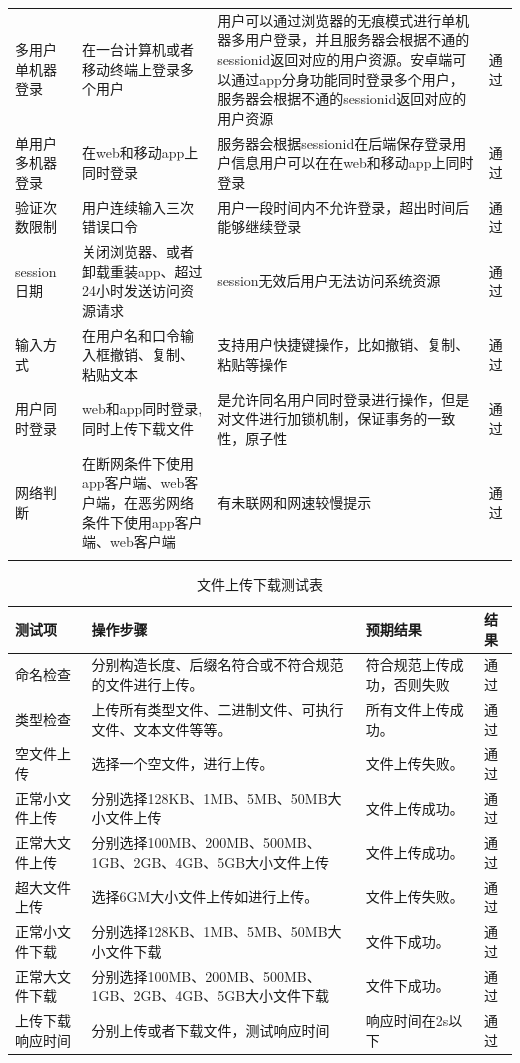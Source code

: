\begin{table}[htbp]
\begin{tabular}{p{2.5cm}p{5cm}p{5cm}p{1cm}}
        多用户单机器登录 & 在一台计算机或者移动终端上登录多个用户 & 用户可以通过浏览器的无痕模式进行单机器多用户登录，并且服务器会根据不通的sessionid返回对应的用户资源。安卓端可以通过app分身功能同时登录多个用户，服务器会根据不通的sessionid返回对应的用户资源 & 通过 \\
        单用户多机器登录 & 在web和移动app上同时登录 & 服务器会根据sessionid在后端保存登录用户信息用户可以在在web和移动app上同时登录 & 通过 \\
        验证次数限制 & 用户连续输入三次错误口令 & 用户一段时间内不允许登录，超出时间后能够继续登录 & 通过 \\
        session日期 & 关闭浏览器、或者卸载重装app、超过24小时发送访问资源请求 & session无效后用户无法访问系统资源 & 通过 \\
        输入方式 & 在用户名和口令输入框撤销、复制、粘贴文本 & 支持用户快捷键操作，比如撤销、复制、粘贴等操作 & 通过 \\
        用户同时登录 & web和app同时登录,同时上传下载文件 & 是允许同名用户同时登录进行操作，但是对文件进行加锁机制，保证事务的一致性，原子性 & 通过 \\
        网络判断 & 在断网条件下使用app客户端、web客户端，在恶劣网络条件下使用app客户端、web客户端 & 有未联网和网速较慢提示 & 通过 \\
        \bottomrule 
    \label{security_user}
    \end{tabular}
\end{table}
\begin{table}[htbp]\center
    \caption{文件上传下载测试表}
    \begin{tabular}{p{4cm}p{5.5cm}p{2.5cm}p{1cm}}
        \toprule
        测试项 &  操作步骤 & 预期结果 & 结果 \\
        \midrule
        命名检查& 分别构造长度、后缀名符合或不符合规范的文件进行上传。 & 符合规范上传成功，否则失败 & 通过 \\
        类型检查& 上传所有类型文件、二进制文件、可执行文件、文本文件等等。 & 所有文件上传成功。 & 通过 \\
        空文件上传 & 选择一个空文件，进行上传。 & 文件上传失败。 & 通过 \\
        正常小文件上传 & 分别选择128KB、1MB、5MB、50MB大小文件上传 & 文件上传成功。 & 通过 \\
        正常大文件上传 & 分别选择100MB、200MB、500MB、1GB、2GB、4GB、5GB大小文件上传 & 文件上传成功。 & 通过 \\
        超大文件上传 & 选择6GM大小文件上传如进行上传。 & 文件上传失败。 & 通过 \\
        正常小文件下载 & 分别选择128KB、1MB、5MB、50MB大小文件下载 & 文件下成功。 & 通过 \\
        正常大文件下载 & 分别选择100MB、200MB、500MB、1GB、2GB、4GB、5GB大小文件下载 & 文件下成功。 & 通过 \\
        上传下载响应时间 & 分别上传或者下载文件，测试响应时间 & 响应时间在2s以下 & 通过 \\
        \bottomrule 
    \end{tabular}
\end{table}

